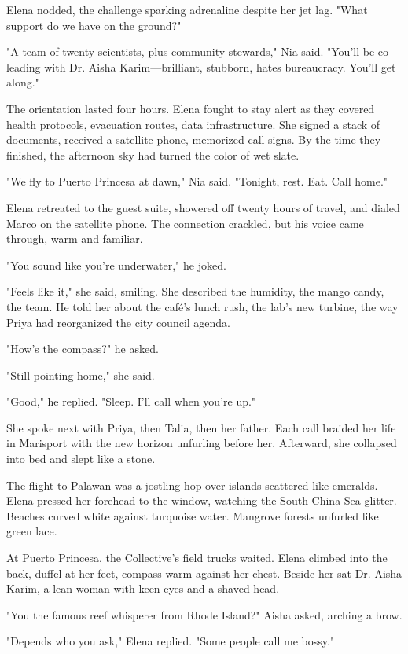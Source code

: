 Elena nodded, the challenge sparking adrenaline despite her jet lag. "What support do we have on the ground?"

"A team of twenty scientists, plus community stewards," Nia said. "You'll be co-leading with Dr. Aisha Karim—brilliant, stubborn, hates bureaucracy. You'll get along."

The orientation lasted four hours. Elena fought to stay alert as they covered health protocols, evacuation routes, data infrastructure. She signed a stack of documents, received a satellite phone, memorized call signs. By the time they finished, the afternoon sky had turned the color of wet slate.

"We fly to Puerto Princesa at dawn," Nia said. "Tonight, rest. Eat. Call home."

Elena retreated to the guest suite, showered off twenty hours of travel, and dialed Marco on the satellite phone. The connection crackled, but his voice came through, warm and familiar.

"You sound like you're underwater," he joked.

"Feels like it," she said, smiling. She described the humidity, the mango candy, the team. He told her about the café's lunch rush, the lab's new turbine, the way Priya had reorganized the city council agenda.

"How's the compass?" he asked.

"Still pointing home," she said.

"Good," he replied. "Sleep. I'll call when you're up."

She spoke next with Priya, then Talia, then her father. Each call braided her life in Marisport with the new horizon unfurling before her. Afterward, she collapsed into bed and slept like a stone.

\bigskip

The flight to Palawan was a jostling hop over islands scattered like emeralds. Elena pressed her forehead to the window, watching the South China Sea glitter. Beaches curved white against turquoise water. Mangrove forests unfurled like green lace.

At Puerto Princesa, the Collective's field trucks waited. Elena climbed into the back, duffel at her feet, compass warm against her chest. Beside her sat Dr. Aisha Karim, a lean woman with keen eyes and a shaved head.

"You the famous reef whisperer from Rhode Island?" Aisha asked, arching a brow.

"Depends who you ask," Elena replied. "Some people call me bossy."

